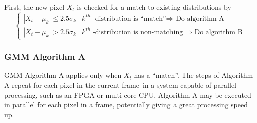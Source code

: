 First, the new pixel $X_t$ is checked for a match to existing distributions by
\begin{equation} \label{eq:gotMatch}
\begin{cases}
|X_t-\mu_k| \leq 2.5\sigma_k    & k^{th}\text{-distribution is ``match''$\Rightarrow$ Do algorithm A}  \\
|X_t-\mu_k| > 2.5\sigma_k & k^{th}\text{-distribution is non-matching $\Rightarrow$ Do algorithm B}
\end{cases}
\end{equation}

\subsubsection{GMM Algorithm A} 
GMM Algorithm A applies only when $X_t$ has a ``match''. 
The steps of Algorithm A repeat for each pixel in the current frame--in a system capable of parallel processing, such as an FPGA or multi-core CPU, Algorithm A may be executed in parallel for each pixel in a frame, potentially giving a great processing speed up.
